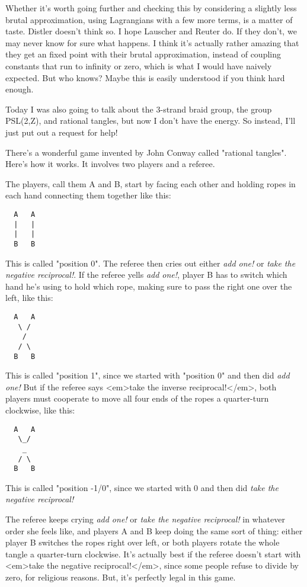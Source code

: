Whether it's worth going further and checking this by considering 
a slightly less brutal approximation, using Lagrangians with a few 
more terms, is a matter of taste.  Distler doesn't think so.  I 
hope Lauscher and Reuter do.  If they don't, we may never know for
sure what happens.  I think it's actually rather amazing that they 
get an fixed point with their brutal approximation, instead of 
coupling constants that run to infinity or zero, which is what 
I would have naively expected.  But who knows?  Maybe this is 
easily understood if you think hard enough.


Today I was also going to talk about the 3-strand braid group, the 
group PSL(2,Z), and rational tangles, but now I don't have the energy.  
So instead, I'll just put out a request for help!  

There's a wonderful game invented by John Conway called "rational
tangles".  Here's how it works.  It involves two players and a referee.

The players, call them A and B, start by facing each other and holding 
ropes in each hand connecting them together like this:
  
\begin{verbatim}
  A   A
  |   |
  |   |
  B   B
\end{verbatim}
    

This is called "position 0".  
The referee then cries out either \emph{add one!} 
or \emph{take the negative reciprocal!}.   
If the referee yells \emph{add one!}, player
B has to switch which hand he's using to hold which rope, making sure to
pass the right one over the left, like this:

\begin{verbatim}
  A   A
   \ /
    /
   / \
  B   B
\end{verbatim}
    

This is called "position 1", 
since we started with "position 0" and
then did \emph{add one!}  But if the referee says <em>take the inverse 
reciprocal!</em>, both players must cooperate to move all four ends of
the ropes a quarter-turn clockwise, like this:

\begin{verbatim}
  A   A
   \_/
    _
   / \
  B   B
\end{verbatim}
    

This is called "position -1/0", since we started with 0 and then
did \emph{take the negative reciprocal!}

The referee keeps crying \emph{add one!}
or \emph{take the negative reciprocal!}
in whatever order she feels like, and players A and B keep doing the
same sort of thing: either player B switches the ropes right over left,
or both players rotate the whole tangle a quarter-turn clockwise.  It's
actually best if the referee doesn't start with <em>take the negative
reciprocal!</em>, since some people refuse to divide by zero, for religious
reasons.  But, it's perfectly legal in this game.

